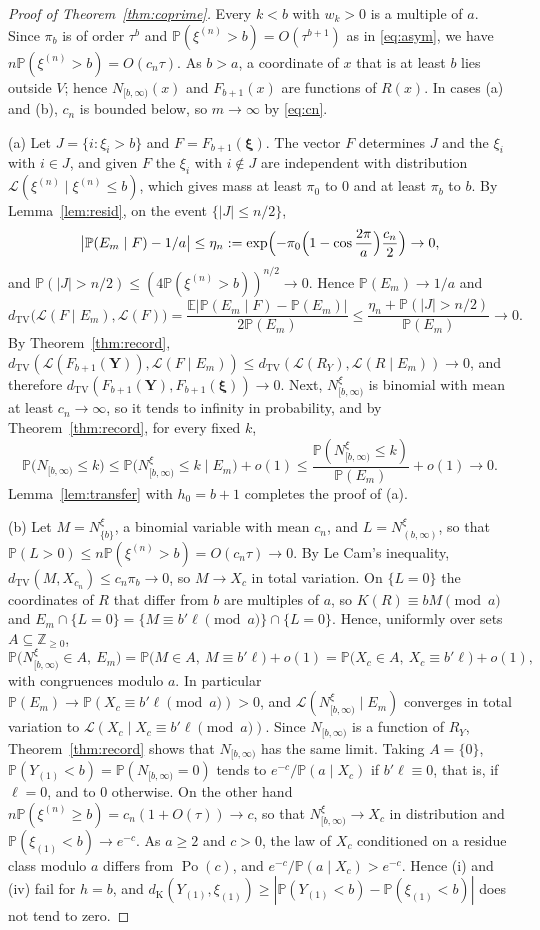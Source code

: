 \documentclass[11pt]{amsart}
\theoremstyle{definition}
\theoremstyle{remark}
\numberwithin{equation}{section}
\newcommand{\Pp}{\mathbb P}
\newcommand{\E}{\mathbb E}
\newcommand{\Z}{\mathbb Z}
\newcommand{\cL}{\mathcal L}
\newcommand{\dtv}{d_{\mathrm{TV}}}
\newcommand{\dK}{d_{\mathrm K}}
\newcommand{\bY}{\mathbf Y}
\newcommand{\bxi}{\boldsymbol\xi}
\DeclareMathOperator{\Po}{Po}
\begin{document}
\begin{proof}[Proof of Theorem~\ref{thm:coprime}]
Every $k<b$ with $w_k>0$ is a multiple of $a$. Since $\pi_b$ is of order $\tau^b$ and $\Pp(\xi^{(n)}>b)=O(\tau^{b+1})$ as in \eqref{eq:asym}, we have $n\Pp(\xi^{(n)}>b)=O(c_n\tau)$. As $b>a$, a coordinate of $x$ that is at least $b$ lies outside $V$; hence $N_{[b,\infty)}(x)$ and $F_{b+1}(x)$ are functions of $R(x)$. In cases (a) and (b), $c_n$ is bounded below, so $m\to\infty$ by \eqref{eq:cn}.

(a) Let $J=\{i:\xi_i>b\}$ and $F=F_{b+1}(\bxi)$. The vector $F$ determines $J$ and the $\xi_i$ with $i\in J$, and given $F$ the $\xi_i$ with $i\notin J$ are independent with distribution $\cL(\xi^{(n)}\mid\xi^{(n)}\le b)$, which gives mass at least $\pi_0$ to $0$ and at least $\pi_b$ to $b$. By Lemma~\ref{lem:resid}, on the event $\{|J|\le n/2\}$,
\[
\bigl|\Pp(E_m\mid F)-1/a\bigr|\le\eta_n:=\exp\Bigl(-\pi_0\Bigl(1-\cos\frac{2\pi}a\Bigr)\frac{c_n}2\Bigr)\to0,
\]
and $\Pp(|J|>n/2)\le(4\Pp(\xi^{(n)}>b))^{n/2}\to0$. Hence $\Pp(E_m)\to1/a$ and
\[
\dtv\bigl(\cL(F\mid E_m),\cL(F)\bigr)=\frac{\E|\Pp(E_m\mid F)-\Pp(E_m)|}{2\Pp(E_m)}\le\frac{\eta_n+\Pp(|J|>n/2)}{\Pp(E_m)}\to0.
\]
By Theorem~\ref{thm:record}, $\dtv(\cL(F_{b+1}(\bY)),\cL(F\mid E_m))\le\dtv(\cL(R_Y),\cL(R\mid E_m))\to0$, and therefore $\dtv(F_{b+1}(\bY),F_{b+1}(\bxi))\to0$. Next, $N^\xi_{[b,\infty)}$ is binomial with mean at least $c_n\to\infty$, so it tends to infinity in probability, and by Theorem~\ref{thm:record}, for every fixed $k$,
\[
\Pp\bigl(N_{[b,\infty)}\le k\bigr)\le\Pp\bigl(N^\xi_{[b,\infty)}\le k\mid E_m\bigr)+o(1)\le\frac{\Pp(N^\xi_{[b,\infty)}\le k)}{\Pp(E_m)}+o(1)\to0.
\]
Lemma~\ref{lem:transfer} with $h_0=b+1$ completes the proof of (a).

(b) Let $M=N^\xi_{\{b\}}$, a binomial variable with mean $c_n$, and $L=N^\xi_{(b,\infty)}$, so that $\Pp(L>0)\le n\Pp(\xi^{(n)}>b)=O(c_n\tau)\to0$. By Le Cam's inequality, $\dtv(M,X_{c_n})\le c_n\pi_b\to0$, so $M\to X_c$ in total variation. On $\{L=0\}$ the coordinates of $R$ that differ from $b$ are multiples of $a$, so $K(R)\equiv bM\pmod a$ and $E_m\cap\{L=0\}=\{M\equiv b'\ell\pmod a\}\cap\{L=0\}$. Hence, uniformly over sets $A\subseteq\Z_{\ge0}$,
\[
\Pp\bigl(N^\xi_{[b,\infty)}\in A,\ E_m\bigr)=\Pp\bigl(M\in A,\ M\equiv b'\ell\bigr)+o(1)=\Pp\bigl(X_c\in A,\ X_c\equiv b'\ell\bigr)+o(1),
\]
with congruences modulo $a$. In particular $\Pp(E_m)\to\Pp(X_c\equiv b'\ell\pmod a)>0$, and $\cL(N^\xi_{[b,\infty)}\mid E_m)$ converges in total variation to $\cL(X_c\mid X_c\equiv b'\ell\pmod a)$. Since $N_{[b,\infty)}$ is a function of $R_Y$, Theorem~\ref{thm:record} shows that $N_{[b,\infty)}$ has the same limit. Taking $A=\{0\}$, $\Pp(Y_{(1)}<b)=\Pp(N_{[b,\infty)}=0)$ tends to $e^{-c}/\Pp(a\mid X_c)$ if $b'\ell\equiv0$, that is, if $\ell=0$, and to $0$ otherwise. On the other hand $n\Pp(\xi^{(n)}\ge b)=c_n(1+O(\tau))\to c$, so that $N^\xi_{[b,\infty)}\to X_c$ in distribution and $\Pp(\xi_{(1)}<b)\to e^{-c}$. As $a\ge2$ and $c>0$, the law of $X_c$ conditioned on a residue class modulo $a$ differs from $\Po(c)$, and $e^{-c}/\Pp(a\mid X_c)>e^{-c}$. Hence (i) and (iv) fail for $h=b$, and $\dK(Y_{(1)},\xi_{(1)})\ge|\Pp(Y_{(1)}<b)-\Pp(\xi_{(1)}<b)|$ does not tend to zero.


\end{proof}
\end{document}
